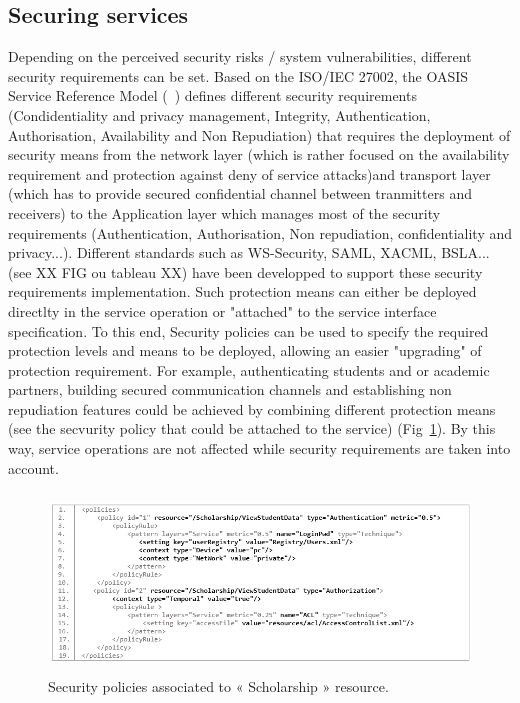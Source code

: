 \documentclass[runningheads,a4paper]{llncs}
\begin{document}
\subsection{Securing services}
Depending on the perceived security risks / system vulnerabilities, different security requirements can be set. Based on the ISO/IEC 27002, the OASIS Service Reference Model (~\cite{OAS06}) defines different security requirements (Condidentiality and privacy management, Integrity, Authentication, Authorisation, Availability and Non Repudiation) that  requires the deployment of security means from the network layer (which is rather focused on the availability requirement and protection against deny of service attacks)and transport layer (which has to provide secured confidential channel between tranmitters and receivers) to the Application layer which manages most of the security requirements (Authentication, Authorisation, Non repudiation, confidentiality and privacy...). Different standards such as WS-Security, SAML, XACML, BSLA...(see XX FIG ou tableau XX) have been developped to support these security requirements implementation.
Such protection means can either be deployed directlty in the service operation or "attached" to the service interface specification. To this end, Security policies can be used to specify the required protection levels and means to be deployed, allowing an easier "upgrading" of protection requirement. 
For example, authenticating students and or academic partners, building secured communication channels and establishing non repudiation features could be achieved by combining different protection means (see the secvurity policy that could be attached to the service) (Fig~\ref{fig:policy}). By this way, service operations are not affected while security requirements are taken into account.

\begin{figure}  
\centering
\includegraphics[height=135pt, width=380pt]{scholarshipPolicies.png}
\caption{Security policies associated to « Scholarship » resource.}
\label{fig:policy}
\end{figure}
\end{document}
